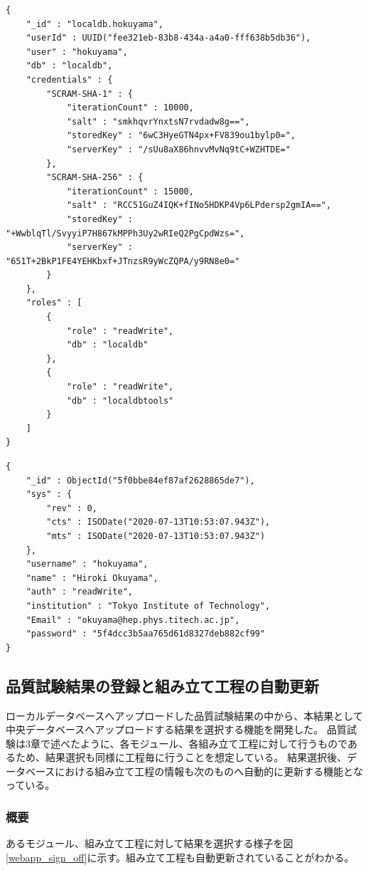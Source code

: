 \begin{lstlisting}[caption=hoge,label=fuga]
{
	"_id" : "localdb.hokuyama",
	"userId" : UUID("fee321eb-83b8-434a-a4a0-fff638b5db36"),
	"user" : "hokuyama",
	"db" : "localdb",
	"credentials" : {
		"SCRAM-SHA-1" : {
			"iterationCount" : 10000,
			"salt" : "smkhqvrYnxtsN7rvdadw8g==",
			"storedKey" : "6wC3HyeGTN4px+FV839ou1bylp0=",
			"serverKey" : "/sUu8aX86hnvvMvNq9tC+WZHTDE="
		},
		"SCRAM-SHA-256" : {
			"iterationCount" : 15000,
			"salt" : "RCC51GuZ4IQK+fINo5HDKP4Vp6LPdersp2gmIA==",
			"storedKey" : "+WwblqTl/SvyyiP7H867kMPPh3Uy2wRIeQ2PgCpdWzs=",
			"serverKey" : "651T+2BkP1FE4YEHKbxf+JTnzsR9yWcZQPA/y9RN8e0="
		}
	},
	"roles" : [
		{
			"role" : "readWrite",
			"db" : "localdb"
		},
		{
			"role" : "readWrite",
			"db" : "localdbtools"
		}
	]
}
\end{lstlisting}
\begin{lstlisting}[caption=hoge,label=fuga]
{
	"_id" : ObjectId("5f0bbe84ef87af2628865de7"),
	"sys" : {
		"rev" : 0,
		"cts" : ISODate("2020-07-13T10:53:07.943Z"),
		"mts" : ISODate("2020-07-13T10:53:07.943Z")
	},
	"username" : "hokuyama",
	"name" : "Hiroki Okuyama",
	"auth" : "readWrite",
	"institution" : "Tokyo Institute of Technology",
	"Email" : "okuyama@hep.phys.titech.ac.jp",
	"password" : "5f4dcc3b5aa765d61d8327deb882cf99"
}
\end{lstlisting}

\newpage
\subsection{品質試験結果の登録と組み立て工程の自動更新}
ローカルデータベースへアップロードした品質試験結果の中から、本結果として中央データベースへアップロードする結果を選択する機能を開発した。
品質試験は3章で述べたように、各モジュール、各組み立て工程に対して行うものであるため、結果選択も同様に工程毎に行うことを想定している。
結果選択後、データベースにおける組み立て工程の情報も次のものへ自動的に更新する機能となっている。

\subsubsection{概要}
あるモジュール、組み立て工程に対して結果を選択する様子を図\ref{webapp_sign_off}に示す。組み立て工程も自動更新されていることがわかる。

